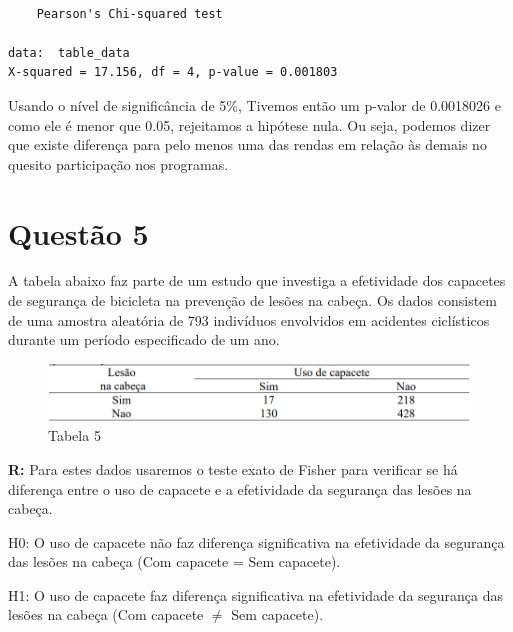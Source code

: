 \documentclass[
  letterpaper,
  DIV=11,
  numbers=noendperiod]{scrartcl}
\begin{document}
\begin{verbatim}

    Pearson's Chi-squared test

data:  table_data
X-squared = 17.156, df = 4, p-value = 0.001803
\end{verbatim}

Usando o nível de significância de 5\%, Tivemos então um p-valor de
0.0018026 e como ele é menor que 0.05, rejeitamos a hipótese nula. Ou
seja, podemos dizer que existe diferença para pelo menos uma das rendas
em relação às demais no quesito participação nos programas.

\section{Questão 5}\label{questuxe3o-5}

A tabela abaixo faz parte de um estudo que investiga a efetividade dos
capacetes de segurança de bicicleta na prevenção de lesões na cabeça. Os
dados consistem de uma amostra aleatória de 793 indivíduos envolvidos em
acidentes ciclísticos durante um período especificado de um ano.

\begin{figure}[H]

{\centering \includegraphics{imgs/q5-tabela.png}

}

\caption{Tabela 5}

\end{figure}%

\textbf{R:} Para estes dados usaremos o teste exato de Fisher para
verificar se há diferença entre o uso de capacete e a efetividade da
segurança das lesões na cabeça.

H0: O uso de capacete não faz diferença significativa na efetividade da
segurança das lesões na cabeça (Com capacete = Sem capacete).

H1: O uso de capacete faz diferença significativa na efetividade da
segurança das lesões na cabeça (Com capacete \(\neq\) Sem capacete).
\end{document}
